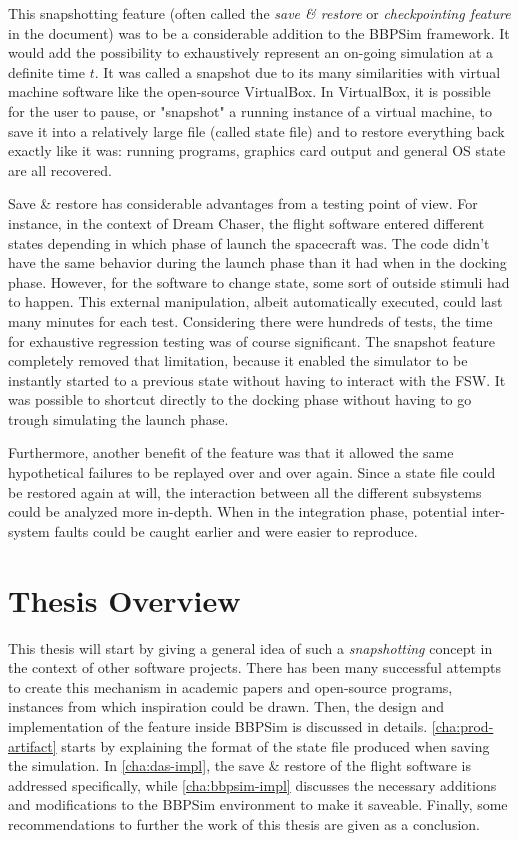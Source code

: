 This snapshotting feature (often called the \textit{save \& restore} or \textit{checkpointing feature} in the document) was to be a considerable addition to the \gls{BBPSim} framework. It would add the possibility to exhaustively represent an on-going simulation at a definite time $t$. It was called a snapshot due to its many similarities with virtual machine software like the open-source VirtualBox. In VirtualBox, it is possible for the user to pause, or "snapshot" a running instance of a virtual machine, to save it into a relatively large file (called state file) and to restore everything back exactly like it was: running programs, graphics card output and general OS state are all recovered.  

Save \& restore has considerable advantages from a testing point of view. For instance, in the context of Dream Chaser, the flight software entered different states depending in which phase of launch the spacecraft was. The code didn't have the same behavior during the launch phase than it had when in the docking phase. However, for the software to change state, some sort of outside stimuli had to happen. This external manipulation, albeit automatically executed, could last many minutes for each test. Considering there were hundreds of tests, the time for exhaustive regression testing was of course significant. The snapshot feature completely removed that limitation, because it enabled the simulator to be instantly started to a previous state without having to interact with the \gls{FSW}. It was possible to shortcut directly to the docking phase without having to go trough simulating the launch phase. 

Furthermore, another benefit of the feature was that it allowed the same hypothetical failures to be replayed over and over again. Since a state file could be restored again at will, the interaction between all the different subsystems could be analyzed more in-depth. When in the integration phase, potential inter-system faults could be caught earlier and were easier to reproduce.  

\section{Thesis Overview}
This thesis will start by giving a general idea of such a \textit{snapshotting} concept in the context of other software projects. There has been many successful attempts to create this mechanism in academic papers and open-source programs, instances from which inspiration could be drawn. Then, the design and implementation of the feature inside \gls{BBPSim} is discussed in details. \autoref{cha:prod-artifact} starts by explaining the format of the state file produced when saving the simulation. In \autoref{cha:das-impl}, the save \& restore of the flight software is addressed specifically, while \autoref{cha:bbpsim-impl} discusses the necessary additions and modifications to the BBPSim environment to make it saveable. Finally, some recommendations to further the work of this thesis are given as a conclusion.
